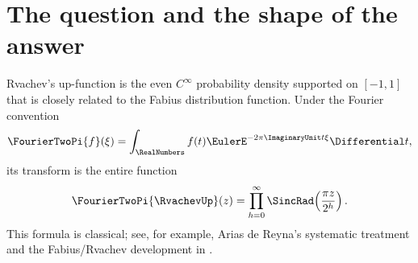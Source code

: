 \documentclass[11pt,oneside]{article}
\numberwithin{equation}{section}
\theoremstyle{definition}
\theoremstyle{remark}
\begin{document}
\begin{abstract}
For the literal Cesaro question, the arithmetic-mean gauge
$g(x)=A_1E_{\kappa_1}(x)$, where numerically
$A_1\approx0.091266124131588$, gives shell means tending to
one and solves the requested two-sided boundedness condition.  It also gives convergence at
dyadic endpoints.  At unrestricted endpoints a nonconstant dyadic-mantissa profile remains,
governed by a continuous singular eigenmeasure of an explicit transfer operator.  We prove
that no gauge with a stabilizing within-shell shape (including powers and iterated logarithms,
regularly varying factors, and fixed log-periodic corrections) can remove this profile.
Unrestricted scale-dependent gauges are not ruled out by that theorem; in fact, a
shell-adaptive positive real-analytic decreasing gauge is constructed below and gives the
literal unrestricted Cesaro limit.  The
multiplicatively natural logarithmic Cesaro mean does converge for all endpoints, with
normalizing constant numerically
$A_1^{\log}\approx0.09386063575678126354$.

Finally, the raw annular maximum
$\mathfrak M_k=\max_{2^k\le x\le2^{k+1}}|\FourierTwoPi{\RvachevUp}(x)|$ has a sharper boundary-layer law:
\[
 \log\mathfrak M_k
 =-\frac{\log2}{2}k^2-(\log2)\kappa_\infty k
 -\frac{W(c(k+1))^2+2W(c(k+1))}{2\log2}
 +\BigO((\log\log k)^2),
\]
where $c=(\log2)\pi^{-1}\sqrt{3/2}$ and $W$ is the principal Lambert function.  Thus the
largest point in a shell approaches its left boundary and carries a second log-normal factor
on the $\log\log x$ scale.  This is normalized at the shell's left endpoint and is fully
compatible with the exact fixed-mantissa ray that is sharp relative to $E_{\kappa_\infty}$
at its own argument.  In contrast, the unique lobe maxima immediately after powers of
two form explicit deep valleys with leading coefficient $-1/\log2$, twice the generic
log-square coefficient.  We also correct and prove the original reciprocal-Gamma and
$q$-Pochhammer tail formula.  Exact proofs, imported classical analytic inputs, rigorous
certificates, and numerical evidence are distinguished throughout.
\end{abstract}

\tableofcontents
\newpage

\section{The question and the shape of the answer}
\label{sec:introduction}

Rvachev's up-function is the even $C^\infty$ probability density supported on $[-1,1]$
that is closely related to the Fabius distribution function.  Under the Fourier convention
\[
 \FourierTwoPi{f}(\xi)=\int_{\RealNumbers}f(t)\EulerE^{-2\pi\ImaginaryUnit t\xi}\Differential t,
\]
its transform is the entire function
\begin{equation}
 \FourierTwoPi{\RvachevUp}(z)
 =\prod_{h=0}^{\infty}\SincRad\!\left(\frac{\pi z}{2^h}\right).
 \label{eq:Phi-definition}
\end{equation}
This formula is classical; see, for example, Arias de Reyna's systematic treatment
\cite{arias1982} and the Fabius/Rvachev development in \cite{proveit}.
\end{document}
